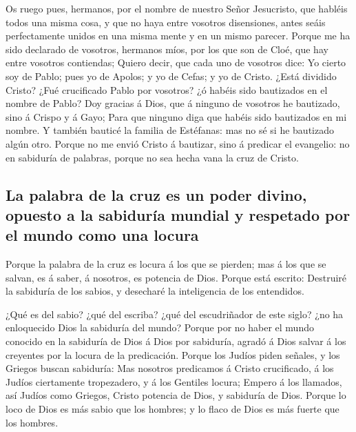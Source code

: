  Os ruego pues, hermanos, por el nombre de nuestro Señor
Jesucristo, que habléis todos una misma cosa, y que no haya entre
vosotros disensiones, antes seáis perfectamente unidos en una misma
mente y en un mismo parecer.  Porque me ha sido declarado
de vosotros, hermanos míos, por los que son de Cloé, que hay entre
vosotros contiendas;  Quiero decir, que cada uno de
vosotros dice: Yo cierto soy de Pablo; pues yo de Apolos; y yo de Cefas;
y yo de Cristo.  ¿Está dividido Cristo? ¿Fué crucificado
Pablo por vosotros? ¿ó habéis sido bautizados en el nombre de Pablo?
 Doy gracias á Dios, que á ninguno de vosotros he
bautizado, sino á Crispo y á Gayo;  Para que ninguno diga
que habéis sido bautizados en mi nombre.  Y también bauticé
la familia de Estéfanas: mas no sé si he bautizado algún otro.
 Porque no me envió Cristo á bautizar, sino á predicar el
evangelio: no en sabiduría de palabras, porque no sea hecha vana la cruz
de Cristo.

\hypertarget{la-palabra-de-la-cruz-es-un-poder-divino-opuesto-a-la-sabiduruxeda-mundial-y-respetado-por-el-mundo-como-una-locura}{%
\subsection{La palabra de la cruz es un poder divino, opuesto a la
sabiduría mundial y respetado por el mundo como una
locura}\label{la-palabra-de-la-cruz-es-un-poder-divino-opuesto-a-la-sabiduruxeda-mundial-y-respetado-por-el-mundo-como-una-locura}}

 Porque la palabra de la cruz es locura á los que se
pierden; mas á los que se salvan, es á saber, á nosotros, es potencia de
Dios.  Porque está escrito: Destruiré la sabiduría de los
sabios, y desecharé la inteligencia de los entendidos.

 ¿Qué es del sabio? ¿qué del escriba? ¿qué del escudriñador
de este siglo? ¿no ha enloquecido Dios la sabiduría del mundo?
 Porque por no haber el mundo conocido en la sabiduría de
Dios á Dios por sabiduría, agradó á Dios salvar á los creyentes por la
locura de la predicación.  Porque los Judíos piden señales,
y los Griegos buscan sabiduría:  Mas nosotros predicamos á
Cristo crucificado, á los Judíos ciertamente tropezadero, y á los
Gentiles locura;  Empero á los llamados, así Judíos como
Griegos, Cristo potencia de Dios, y sabiduría de Dios. 
Porque lo loco de Dios es más sabio que los hombres; y lo flaco de Dios
es más fuerte que los hombres.

